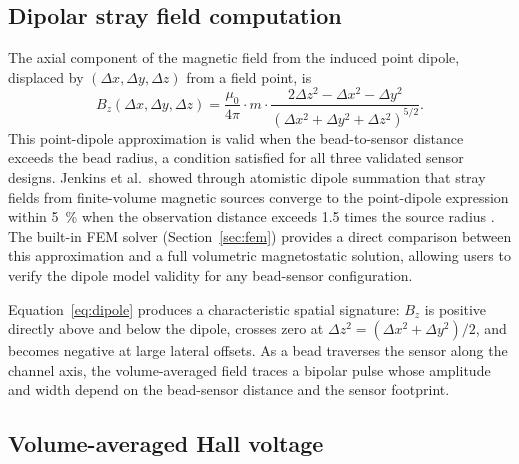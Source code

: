 \documentclass[preprint,review,12pt]{elsarticle}
\begin{document}
\subsection{Dipolar stray field computation}
\label{sec:strayfield}

The axial component of the magnetic field from the induced point dipole, displaced by $(\Delta x, \Delta y, \Delta z)$ from a field point, is \cite{griffiths}
\begin{equation}
B_z(\Delta x, \Delta y, \Delta z) = \frac{\mu_0}{4\pi} \cdot m \cdot \frac{2\Delta z^2 - \Delta x^2 - \Delta y^2}{\left(\Delta x^2 + \Delta y^2 + \Delta z^2\right)^{5/2}}.
\label{eq:dipole}
\end{equation}
This point-dipole approximation is valid when the bead-to-sensor distance exceeds the bead radius, a condition satisfied for all three validated sensor designs. Jenkins et al.\ showed through atomistic dipole summation that stray fields from finite-volume magnetic sources converge to the point-dipole expression within \SI{5}{\percent} when the observation distance exceeds 1.5 times the source radius \cite{jenkins2019}. The built-in FEM solver (Section~\ref{sec:fem}) provides a direct comparison between this approximation and a full volumetric magnetostatic solution, allowing users to verify the dipole model validity for any bead-sensor configuration.

Equation~\eqref{eq:dipole} produces a characteristic spatial signature: $B_z$ is positive directly above and below the dipole, crosses zero at $\Delta z^2 = (\Delta x^2 + \Delta y^2)/2$, and becomes negative at large lateral offsets. As a bead traverses the sensor along the channel axis, the volume-averaged field traces a bipolar pulse whose amplitude and width depend on the bead-sensor distance and the sensor footprint.

\subsection{Volume-averaged Hall voltage}
\label{sec:hallvoltage}
\end{document}
